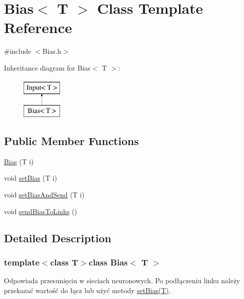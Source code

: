 \hypertarget{class_bias}{\section{\-Bias$<$ \-T $>$ \-Class \-Template \-Reference}
\label{class_bias}
}


{\ttfamily \#include $<$\-Bias.\-h$>$}

\-Inheritance diagram for \-Bias$<$ \-T $>$\-:\begin{figure}[H]
\begin{center}
\leavevmode
\includegraphics[height=2.000000cm]{class_bias}
\end{center}
\end{figure}
\subsection*{\-Public \-Member \-Functions}
\begin{DoxyCompactItemize}
\item 
\hyperlink{class_bias_abb349bc7ef3317db4a7ce75c96dbb533}{\-Bias} (\-T i)
\item 
void \hyperlink{class_bias_ab6df47ae8047f915cfa1fb77683b0eb7}{set\-Bias} (\-T i)
\item 
void \hyperlink{class_bias_a5489ed8d5ecb5bd14e21532968bb3027}{set\-Bias\-And\-Send} (\-T i)
\item 
void \hyperlink{class_bias_a3bf2cdb0a52508399df31b9f7dcf358b}{send\-Bias\-To\-Links} ()
\end{DoxyCompactItemize}


\subsection{\-Detailed \-Description}
\subsubsection*{template$<$class T$>$class Bias$<$ T $>$}

\-Odpowiada przesunięciu w sieciach neuronowych. \-Po podłączeniu linku należy przekazać wartość do łącz lub użyć metody \hyperlink{class_bias_ab6df47ae8047f915cfa1fb77683b0eb7}{set\-Bias(\-T)}. 

